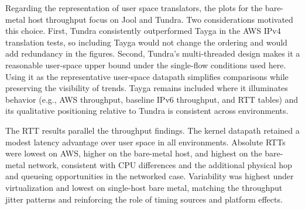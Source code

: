 Regarding the representation of user space translators, the plots for the bare-metal host throughput focus on Jool and Tundra. Two considerations motivated this choice. First, Tundra consistently outperformed Tayga in the AWS IPv4 translation tests, so including Tayga would not change the ordering and would add redundancy in the figures. Second, Tundra’s multi-threaded design makes it a reasonable user-space upper bound under the single-flow conditions used here. Using it as the representative user-space datapath simplifies comparisons while preserving the visibility of trends. Tayga remains included where it illuminates behavior (e.g., AWS throughput, baseline IPv6 throughput, and RTT tables) and its qualitative positioning relative to Tundra is consistent across environments.

The RTT results parallel the throughput findings. The kernel datapath retained a modest latency advantage over user space in all environments. Absolute RTTs were lowest on AWS, higher on the bare-metal host, and highest on the bare-metal network, consistent with CPU differences and the additional physical hop and queueing opportunities in the networked case. Variability was highest under virtualization and lowest on single-host bare metal, matching the throughput jitter patterns and reinforcing the role of timing sources and platform effects.
